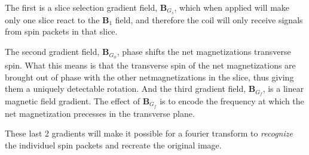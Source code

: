 The first is a slice selection gradient field, $\mathbf{B}_{G_s}$,
which when applied will make only one slice react to the
$\mathbf{B}_1$ field, and therefore the coil will only receive signals
from spin packets in that slice.

The second gradient field, $\mathbf{B}_{G_\phi}$, phase shifts the net
magnetizations transverse spin. What this means is that the transverse
spin of the net magnetizations are brought out of phase with the other
netmagnetizations in the slice, thus giving them a uniquely detectable
rotation. And the third gradient field, $\mathbf{B}_{G_f}$, is a
linear magnetic field gradient. The effect of $\mathbf{B}_{G_f}$ is to
encode the frequency at which the net magnetization precesses in the
transverse plane.

These last 2 gradients will make it possible for a fourier transform
to \emph{recognize} the individuel spin packets and recreate the original
image.

